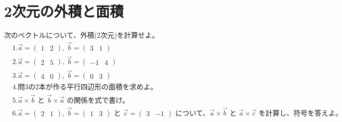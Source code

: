 \documentclass[paper=b4j,landscape,twocolumn,fleqn]{jlreq}
\begin{document}
\section{2次元の外積と面積}
次のベクトルについて、外積(2次元)を計算せよ。
\begin{align*}
　&1.　\vec{a}=\begin{pmatrix}1 & 2\end{pmatrix},\ \vec{b}=\begin{pmatrix}3 & 1\end{pmatrix}\\[0.45em]
　&2.　\vec{a}=\begin{pmatrix}2 & 5\end{pmatrix},\ \vec{b}=\begin{pmatrix}-1 & 4\end{pmatrix}\\[0.45em]
　&3.　\vec{a}=\begin{pmatrix}4 & 0\end{pmatrix},\ \vec{b}=\begin{pmatrix}0 & 3\end{pmatrix}\\[0.45em]
　&4.　問3の2本が作る平行四辺形の面積を求めよ。\\[0.45em]
　&5.　\vec{a}\times\vec{b}\text{ と }\vec{b}\times\vec{a}\text{ の関係を式で書け。}\\[0.45em]
　&6.　\vec{a}=\begin{pmatrix}2 & 1\end{pmatrix},\ \vec{b}=\begin{pmatrix}1 & 3\end{pmatrix}\text{ と }\vec{c}=\begin{pmatrix}3 & -1\end{pmatrix}\text{ について、}\vec{a}\times\vec{b}\text{ と }\vec{a}\times\vec{c}\text{ を計算し、符号を答えよ。}\\[0.45em]
\end{align*}
\end{document}
